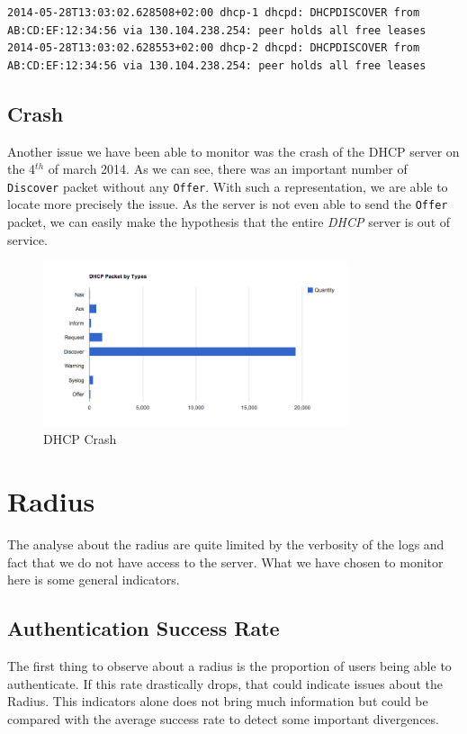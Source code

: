 \begin{lstlisting}[frame=single,breaklines=true,caption={Misleading Error Message}]
2014-05-28T13:03:02.628508+02:00 dhcp-1 dhcpd: DHCPDISCOVER from AB:CD:EF:12:34:56 via 130.104.238.254: peer holds all free leases
2014-05-28T13:03:02.628553+02:00 dhcp-2 dhcpd: DHCPDISCOVER from AB:CD:EF:12:34:56 via 130.104.238.254: peer holds all free leases
\end{lstlisting}

\subsection{Crash}
Another issue we have been able to monitor was the crash of the DHCP server on the 4$^{th}$ of march 2014. As we can see, there was an important number of \texttt{Discover} packet without any \texttt{Offer}. With such a representation, we are able to locate more precisely the issue. As the server is not even able to send the \texttt{Offer} packet, we can easily make the hypothesis that the entire \emph{DHCP} server is out of service.

\begin{figure}[H]
	\centering
   \includegraphics[width=0.8\textwidth]{Pictures/chapter5/dhcpCrash.png}
   \caption{DHCP Crash}
\end{figure}

\section{Radius}
The analyse about the radius are quite limited by the verbosity of the logs and fact that we do not have access to the server. What we have chosen to monitor here is some general indicators.

\subsection{Authentication Success Rate}
The first thing to observe about a radius is the proportion of users being able to authenticate. If this rate drastically drops, that could indicate issues about the Radius. This indicators alone does not bring much information but could be compared with the average success rate to detect some important divergences.

